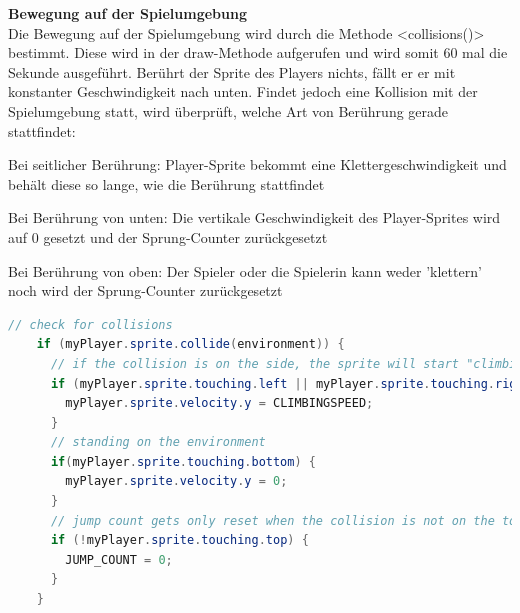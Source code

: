\textbf{Bewegung auf der Spielumgebung}
\\
Die Bewegung auf der Spielumgebung wird durch die Methode <collisions()> bestimmt. Diese wird in der draw-Methode aufgerufen und wird somit 60 mal die Sekunde ausgeführt.
Berührt der Sprite des Players nichts, fällt er er mit konstanter Geschwindigkeit nach unten.
Findet jedoch eine Kollision mit der Spielumgebung statt, wird überprüft, welche Art von Berührung gerade stattfindet:

\begin{compactitem}
    \item Bei seitlicher Berührung: Player-Sprite bekommt eine Klettergeschwindigkeit und behält diese so lange, wie die Berührung stattfindet
    \item Bei Berührung von unten: Die vertikale Geschwindigkeit des Player-Sprites wird auf 0 gesetzt und der Sprung-Counter zurückgesetzt
    \item Bei Berührung von oben: Der Spieler oder die Spielerin kann weder 'klettern' noch wird der Sprung-Counter zurückgesetzt
\end{compactitem}

\begin{lstlisting}[caption=Bewegung auf der Spielumgebung,language=Java,label=lst:impl:collisions]
    // check for collisions
    if (myPlayer.sprite.collide(environment)) {
      // if the collision is on the side, the sprite will start "climbing" with a certain speed
      if (myPlayer.sprite.touching.left || myPlayer.sprite.touching.right) {
        myPlayer.sprite.velocity.y = CLIMBINGSPEED;
      }
      // standing on the environment
      if(myPlayer.sprite.touching.bottom) {
        myPlayer.sprite.velocity.y = 0; 
      }
      // jump count gets only reset when the collision is not on the top of the player-sprite
      if (!myPlayer.sprite.touching.top) {
        JUMP_COUNT = 0;
      }
    }
\end{lstlisting}

